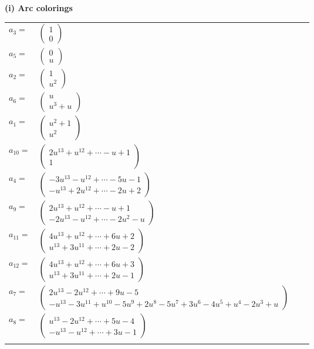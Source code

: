 \documentclass[1p]{elsarticle_modified}
\theoremstyle{definition}
\begin{document}
\flushleft \textbf{(i) Arc colorings}\\
\begin{tabular}{m{7pt} m{180pt} m{7pt} m{180pt} }
\flushright $a_{3}=$&$\begin{pmatrix}1\\0\end{pmatrix}$ \\
\flushright $a_{5}=$&$\begin{pmatrix}0\\u\end{pmatrix}$ \\
\flushright $a_{2}=$&$\begin{pmatrix}1\\u^2\end{pmatrix}$ \\
\flushright $a_{6}=$&$\begin{pmatrix}u\\u^3+u\end{pmatrix}$ \\
\flushright $a_{1}=$&$\begin{pmatrix}u^2+1\\u^2\end{pmatrix}$ \\
\flushright $a_{10}=$&$\begin{pmatrix}2 u^{13}+u^{12}+\cdots- u+1\\1\end{pmatrix}$ \\
\flushright $a_{4}=$&$\begin{pmatrix}-3 u^{13}- u^{12}+\cdots-5 u-1\\- u^{13}+2 u^{12}+\cdots-2 u+2\end{pmatrix}$ \\
\flushright $a_{9}=$&$\begin{pmatrix}2 u^{13}+u^{12}+\cdots- u+1\\-2 u^{13}- u^{12}+\cdots-2 u^2- u\end{pmatrix}$ \\
\flushright $a_{11}=$&$\begin{pmatrix}4 u^{13}+u^{12}+\cdots+6 u+2\\u^{13}+3 u^{11}+\cdots+2 u-2\end{pmatrix}$ \\
\flushright $a_{12}=$&$\begin{pmatrix}4 u^{13}+u^{12}+\cdots+6 u+3\\u^{13}+3 u^{11}+\cdots+2 u-1\end{pmatrix}$ \\
\flushright $a_{7}=$&$\begin{pmatrix}2 u^{13}-2 u^{12}+\cdots+9 u-5\\- u^{13}-3 u^{11}+u^{10}-5 u^9+2 u^8-5 u^7+3 u^6-4 u^5+u^4-2 u^3+u\end{pmatrix}$ \\
\flushright $a_{8}=$&$\begin{pmatrix}u^{13}-2 u^{12}+\cdots+5 u-4\\- u^{13}- u^{12}+\cdots+3 u-1\end{pmatrix}$\\&\end{tabular}
\end{document}
